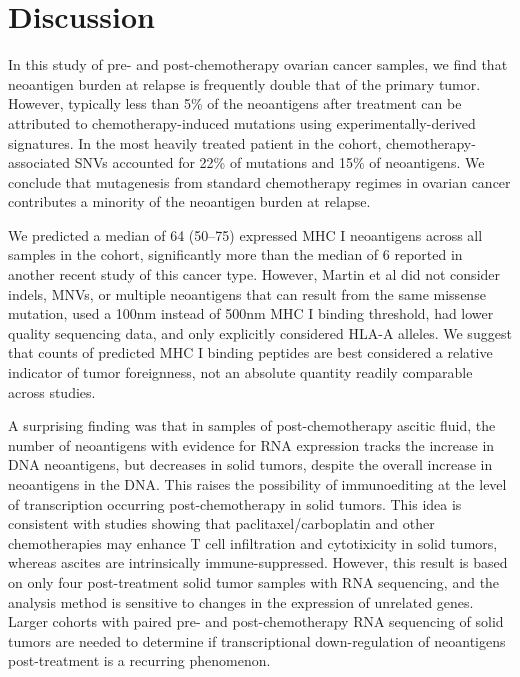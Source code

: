 \section*{Discussion}

In this study of pre- and post-chemotherapy ovarian cancer samples, we find that neoantigen burden at relapse is frequently double that of the primary tumor. However, typically less than 5\% of the neoantigens after treatment can be attributed to chemotherapy-induced mutations using experimentally-derived signatures. In the most heavily treated patient in the cohort, chemotherapy-associated SNVs accounted for 22\% of mutations and 15\% of neoantigens. We conclude that mutagenesis from standard chemotherapy regimes in ovarian cancer contributes a minority of the neoantigen burden at relapse.


We predicted a median of 64 (50--75) expressed MHC I neoantigens across all samples in the cohort, significantly more than the median of 6 reported in another recent study of this cancer type\cite{Martin_2016}. However, Martin et al did not consider indels, MNVs, or multiple neoantigens that can result from the same missense mutation, used a 100nm instead of 500nm MHC I binding threshold, had lower quality sequencing data, and only explicitly considered HLA-A alleles. We suggest that counts of predicted MHC I binding peptides are best considered a relative indicator of tumor foreignness, not an absolute quantity readily comparable across studies.

A surprising finding was that in samples of post-chemotherapy ascitic fluid, the number of neoantigens with evidence for RNA expression tracks the increase in DNA neoantigens, but decreases in solid tumors, despite the overall increase in neoantigens in the DNA. This raises the possibility of immunoediting\cite{Dunn_2002} at the level of transcription occurring post-chemotherapy in solid tumors. This idea is consistent with studies showing that paclitaxel/carboplatin and other chemotherapies may enhance T cell infiltration and cytotixicity in solid tumors\cite{Demaria2001,Wu_2009,Pfannenstiel_2010,Hodge_2013}, whereas ascites are intrinsically immune-suppressed\cite{Giuntoli2009,Simpson-Abelson2013,Singel2016}. However, this result is based on only four post-treatment solid tumor samples with RNA sequencing, and the analysis method is sensitive to changes in the expression of unrelated genes. Larger cohorts with paired pre- and post-chemotherapy RNA sequencing of solid tumors are needed to determine if transcriptional down-regulation of neoantigens post-treatment is a recurring phenomenon.

